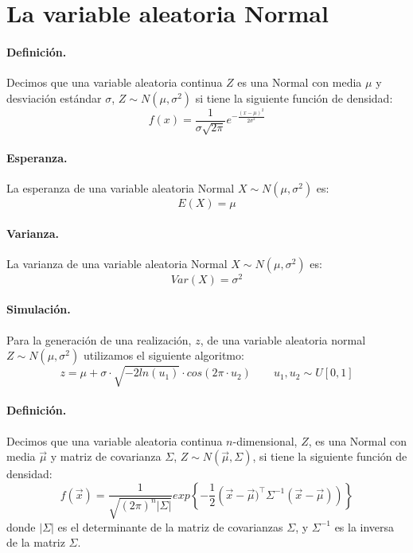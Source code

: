
\section{La variable aleatoria Normal}

\paragraph{Definici\'on.} Decimos que una variable aleatoria continua $Z$ es 
una Normal con media $\mu$ y desviaci\'on est\'andar $\sigma$, 
$Z \sim N(\mu, \sigma^2)$ si tiene la siguiente funci\'on de densidad:
\begin{displaymath}
f(x) = \frac{1}{\sigma \sqrt{2 \pi}} e^{-\frac{(x-\mu)^2}{2 \sigma^2}}
\end{displaymath}

\paragraph{Esperanza.} La esperanza de una variable aleatoria Normal 
$X \sim N(\mu,\sigma^2)$ es:
\begin{displaymath}
E(X) = \mu
\end{displaymath}

\paragraph{Varianza.} La varianza de una variable aleatoria Normal 
$X \sim N(\mu,\sigma^2)$ es:
\begin{displaymath}
Var(X)= \sigma^2
\end{displaymath}

\paragraph{Simulaci\'on.} Para la generaci\'on de una realizaci\'on, $z$, de 
una variable aleatoria normal $Z \sim N(\mu, \sigma^2)$ utilizamos el siguiente 
algoritmo:
\begin{displaymath}
z = \mu + \sigma\cdot \sqrt{-2 ln(u_1)} \cdot cos(2 \pi \cdot u_2)
\qquad u_1, u_2 \sim U[0,1]
\end{displaymath}

\paragraph{Definici\'on.} Decimos que una variable aleatoria continua 
$n$-dimensional, $Z$, es una Normal con media $\vec{\mu}$ y matriz de 
covarianza $\Sigma$, $Z \sim N(\vec{\mu}, \Sigma)$, si tiene la 
siguiente funci\'on de densidad:
\begin{displaymath}
f(\vec{x}) = \frac{1}{\sqrt{(2 \pi)^n \left| \Sigma \right|}} 
exp\left\{-\frac{1}{2}\left(\vec{x}-\vec{\mu})^{\top} \Sigma^{-1} (\vec{x}-\vec{\mu}) \right)\right\}
\end{displaymath}
donde $\left|\Sigma\right|$ es el determinante de la matriz de covarianzas 
$\Sigma$, y $\Sigma^{-1}$ es la inversa de la matriz $\Sigma$.

